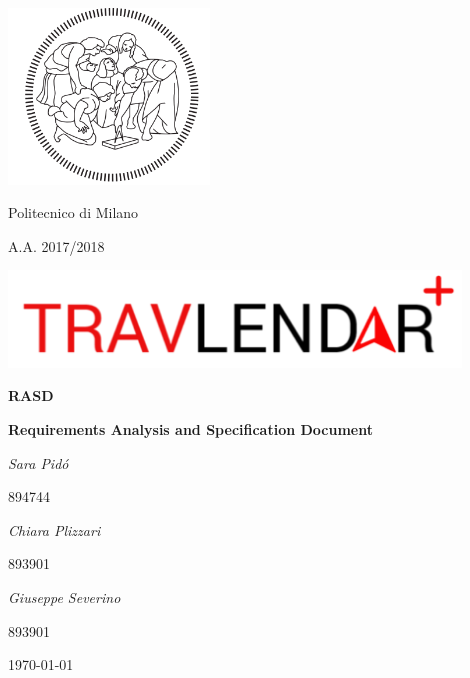 \documentclass[12pt,titlepage]{article}
\begin{document}
\begin{titlepage}
\centering
\includegraphics[width=0.4\textwidth]{Logo}\par
	{{Politecnico di Milano} \par}
	{{A.A. 2017/2018} \par}
	\vspace{1.5cm}
	\includegraphics[width=0.9\textwidth]{LogoTravlendar}\par
	\vspace{1.5cm}
	{\Huge \textbf {RASD}\par}
	{ \textbf{Requirements Analysis and Specification Document} \par}
	\vspace{1.5cm}
	{\Large\itshape Sara Pid\'o  }{\Large   {  894744}\par}
	{\Large\itshape Chiara Plizzari }{\Large   {  893901}\par}
	{\Large\itshape Giuseppe Severino }{\Large   {  893901}\par}
	\vspace{2cm}
	\vfill
	\pagebreak
	{\large \today \par}
\end{titlepage}




 


\end{document}
